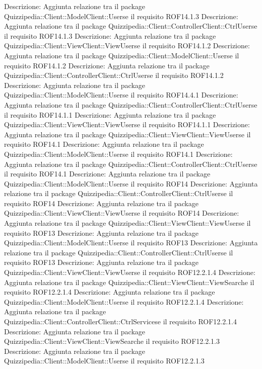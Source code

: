 Descrizione: Aggiunta relazione tra il package Quizzipedia::Client::ModelClient::Userse il requisito ROF14.1.3 
Descrizione: Aggiunta relazione tra il package Quizzipedia::Client::ControllerClient::CtrlUserse il requisito ROF14.1.3 
Descrizione: Aggiunta relazione tra il package Quizzipedia::Client::ViewClient::ViewUserse il requisito ROF14.1.2 
Descrizione: Aggiunta relazione tra il package Quizzipedia::Client::ModelClient::Userse il requisito ROF14.1.2 
Descrizione: Aggiunta relazione tra il package Quizzipedia::Client::ControllerClient::CtrlUserse il requisito ROF14.1.2 
Descrizione: Aggiunta relazione tra il package Quizzipedia::Client::ModelClient::Userse il requisito ROF14.4.1 
Descrizione: Aggiunta relazione tra il package Quizzipedia::Client::ControllerClient::CtrlUserse il requisito ROF14.1.1 
Descrizione: Aggiunta relazione tra il package Quizzipedia::Client::ViewClient::ViewUserse il requisito ROF14.1.1 
Descrizione: Aggiunta relazione tra il package Quizzipedia::Client::ViewClient::ViewUserse il requisito ROF14.1 
Descrizione: Aggiunta relazione tra il package Quizzipedia::Client::ModelClient::Userse il requisito ROF14.1 
Descrizione: Aggiunta relazione tra il package Quizzipedia::Client::ControllerClient::CtrlUserse il requisito ROF14.1 
Descrizione: Aggiunta relazione tra il package Quizzipedia::Client::ModelClient::Userse il requisito ROF14 
Descrizione: Aggiunta relazione tra il package Quizzipedia::Client::ControllerClient::CtrlUserse il requisito ROF14 
Descrizione: Aggiunta relazione tra il package Quizzipedia::Client::ViewClient::ViewUserse il requisito ROF14 
Descrizione: Aggiunta relazione tra il package Quizzipedia::Client::ViewClient::ViewUserse il requisito ROF13 
Descrizione: Aggiunta relazione tra il package Quizzipedia::Client::ModelClient::Userse il requisito ROF13 
Descrizione: Aggiunta relazione tra il package Quizzipedia::Client::ControllerClient::CtrlUserse il requisito ROF13 
Descrizione: Aggiunta relazione tra il package Quizzipedia::Client::ViewClient::ViewUserse il requisito ROF12.2.1.4 
Descrizione: Aggiunta relazione tra il package Quizzipedia::Client::ViewClient::ViewSearche il requisito ROF12.2.1.4 
Descrizione: Aggiunta relazione tra il package Quizzipedia::Client::ModelClient::Userse il requisito ROF12.2.1.4 
Descrizione: Aggiunta relazione tra il package Quizzipedia::Client::ControllerClient::CtrlServicese il requisito ROF12.2.1.4 
Descrizione: Aggiunta relazione tra il package Quizzipedia::Client::ViewClient::ViewSearche il requisito ROF12.2.1.3 
Descrizione: Aggiunta relazione tra il package Quizzipedia::Client::ModelClient::Userse il requisito ROF12.2.1.3 
